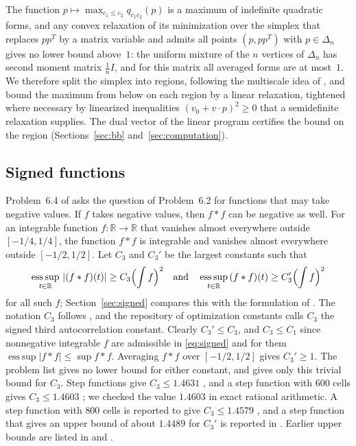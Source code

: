 \documentclass[11pt]{amsart}
\theoremstyle{definition}
\theoremstyle{remark}
\numberwithin{equation}{section}
\newcommand{\R}{\mathbb{R}}
\newcommand{\esssup}{\operatorname*{ess\,sup}}
\begin{document}
The function $p\mapsto\max_{c_1\le c_2}q_{c_1c_2}(p)$ is a maximum of indefinite quadratic forms, and any convex relaxation of its minimization over the simplex that replaces $pp^{T}$ by a matrix variable and admits all points $(p,pp^{T})$ with $p\in\Delta_n$ gives no lower bound above~$1$: the uniform mixture of the $n$ vertices of $\Delta_n$ has second moment matrix $\frac1n I$, and for this matrix all averaged forms are at most~$1$. We therefore split the simplex into regions, following the multiscale idea of \cite{CS17}, and bound the maximum from below on each region by a linear relaxation, tightened where necessary by linearized inequalities $(v_0+v\cdot p)^2\ge0$ that a semidefinite relaxation supplies. The dual vector of the linear program certifies the bound on the region (Sections~\ref{sec:bb} and~\ref{sec:computation}).

\subsection*{Signed functions}
Problem~6.4 of \cite{GGTW25} asks the question of Problem~6.2 for functions that may take negative values. If $f$ takes negative values, then $f*f$ can be negative as well. For an integrable function $f\colon\R\to\R$ that vanishes almost everywhere outside $[-1/4,1/4]$, the function $f*f$ is integrable and vanishes almost everywhere outside $[-1/2,1/2]$. Let $C_3$ and $C_3'$ be the largest constants such that
\begin{equation}\label{eq:signed}
\esssup_{t\in\R}\,|(f*f)(t)|\ge C_3\Bigl(\int f\Bigr)^2\quad\text{and}\quad\esssup_{t\in\R}\,(f*f)(t)\ge C_3'\Bigl(\int f\Bigr)^2
\end{equation}
for all such $f$; Section~\ref{sec:signed} compares this with the formulation of \cite{GGTW25}. The notation $C_3$ follows \cite{AE25}, and the repository of optimization constants \cite{OC26} calls $C_3$ the signed third autocorrelation constant. Clearly $C_3'\le C_3$, and $C_3\le C_1$ since nonnegative integrable $f$ are admissible in \eqref{eq:signed} and for them $\esssup|f*f|\le\sup f*f$. Averaging $f*f$ over $[-1/2,1/2]$ gives $C_3'\ge1$. The problem list \cite{GGTW25} gives no lower bound for either constant, and \cite{OC26} gives only this trivial bound for $C_3$. Step functions give $C_3\le1.4631$ \cite{OC26}, and a step function with $600$ cells gives $C_3\le1.4603$ \cite{Ger26}; we checked the value $1.4603$ in exact rational arithmetic. A step function with $800$ cells is reported to give $C_3\le1.4579$ \cite{KKHL26}, and a step function that gives an upper bound of about $1.4489$ for $C_3'$ is reported in \cite{Jana26}. Earlier upper bounds are listed in \cite{GGTW25} and \cite[Table~1 and Appendix~A.5]{BKPZ26}.
\end{document}

